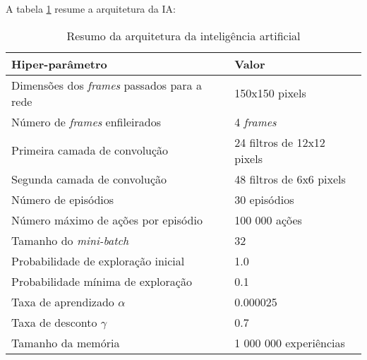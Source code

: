 A tabela \ref{table:2} resume a arquitetura da IA:

\begin{table}
\begin{tabular}{| p{7cm} | p{7cm} |}
  \hline
  \textbf{Hiper-parâmetro} & \textbf{Valor} \\ \hline
  Dimensões dos \textit{frames} passados para a rede & 150x150 pixels \\ \hline
  Número de \textit{frames} enfileirados & 4 \textit{frames} \\ \hline
  Primeira camada de convolução & 24 filtros de 12x12 pixels \\ \hline
  Segunda camada de convolução & 48 filtros de 6x6 pixels \\ \hline
  Número de episódios & 30 episódios \\ \hline
  Número máximo de ações por episódio & 100 000 ações \\ \hline
  Tamanho do \textit{mini-batch} & 32 \\ \hline
  Probabilidade de exploração inicial & 1.0 \\ \hline
  Probabilidade mínima de exploração & 0.1 \\ \hline
  Taxa de aprendizado $\alpha$ & 0.000025 \\ \hline
  Taxa de desconto $\gamma$ & 0.7 \\ \hline
  Tamanho da memória & 1 000 000 experiências \\ \hline
\end{tabular}
\caption{Resumo da arquitetura da inteligência artificial}
\label{table:2}
\end{table}
